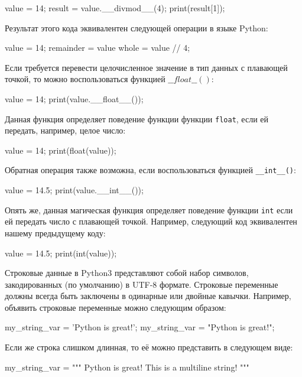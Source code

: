 \begin{python}
value = 14;
result = value.__divmod__(4);
print(result[1]);
\end{python}  

Результат этого кода эквивалентен следующей операции в языке Python:

\begin{python}
value = 14;
remainder = value %
whole = value // 4;
\end{python}

Если требуется перевести целочисленное значение в тип данных с плавающей точкой,
то можно воспользоваться функцией $\_\_float\_\_()$:

\begin{python}
value = 14;
print(value.__float__());
\end{python}

Данная функция определяет поведение функции функции \texttt{float},
если ей передать, например, целое число:

\begin{python}
value = 14;
print(float(value));
\end{python}

Обратная операция также возможна, если воспользоваться функцией \texttt{\_\_int\_\_()}:

\begin{python}
value = 14.5;
print(value.__int__());
\end{python} 

Опять же, данная магическая функция определяет поведение функции \texttt{int}
если ей передать число с плавающей точкой. Например, следующий код эквивалентен
нашему предыдущему коду:

\begin{python}
value = 14.5;
print(int(value));
\end{python} 


Строковые данные в Python3 представляют собой набор символов, 
закодированных (по умолчанию) в UTF-8 формате. Строковые переменные должны всегда 
быть заключены в одинарные или двойные кавычки. Например, 
объявить строковые переменные можно следующим образом:

\begin{python}
my_string_var = 'Python is great!';
my_string_var = "Python is great!";
\end{python}

Если же строка слишком длинная, то её можно представить в следующем виде:

\begin{python}
my_string_var = """
Python is great!
This is a multiline string!
"""
\end{python}

